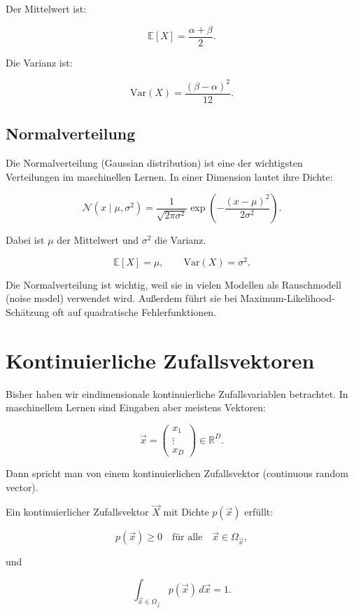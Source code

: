 Der Mittelwert ist:

\[
    \mathbb{E}[X]
    =
    \frac{\alpha+\beta}{2}.
\]

Die Varianz ist:

\[
    \mathrm{Var}(X)
    =
    \frac{(\beta-\alpha)^2}{12}.
\]

\subsection{Normalverteilung}

Die Normalverteilung (Gaussian distribution) ist eine der wichtigsten Verteilungen im maschinellen Lernen.
In einer Dimension lautet ihre Dichte:

\[
    \mathcal{N}(x \mid \mu,\sigma^2)
    =
    \frac{1}{\sqrt{2\pi\sigma^2}}
    \exp\left(
        -\frac{(x-\mu)^2}{2\sigma^2}
    \right).
\]

Dabei ist \(\mu\) der Mittelwert und \(\sigma^2\) die Varianz.

\[
    \mathbb{E}[X] = \mu,
    \qquad
    \mathrm{Var}(X) = \sigma^2.
\]

\begin{conceptbox}
Die Normalverteilung ist wichtig, weil sie in vielen Modellen als Rauschmodell (noise model) verwendet wird.
Außerdem führt sie bei Maximum-Likelihood-Schätzung oft auf quadratische Fehlerfunktionen.
\end{conceptbox}

\section{Kontinuierliche Zufallsvektoren}

Bisher haben wir eindimensionale kontinuierliche Zufallsvariablen betrachtet.
In maschinellem Lernen sind Eingaben aber meistens Vektoren:

\[
    \vec{x}
    =
    \begin{pmatrix}
        x_1 \\
        \vdots \\
        x_D
    \end{pmatrix}
    \in \mathbb{R}^D.
\]

Dann spricht man von einem kontinuierlichen Zufallsvektor (continuous random vector).

\begin{definitionbox}
Ein kontinuierlicher Zufallsvektor \(\vec{X}\) mit Dichte \(p(\vec{x})\) erfüllt:

\[
    p(\vec{x}) \geq 0
    \quad
    \text{für alle}
    \quad
    \vec{x} \in \Omega_{\vec{x}},
\]

und

\[
    \int_{\vec{x} \in \Omega_{\vec{x}}}
    p(\vec{x})\,d\vec{x}
    =
    1.
\]
\end{definitionbox}

